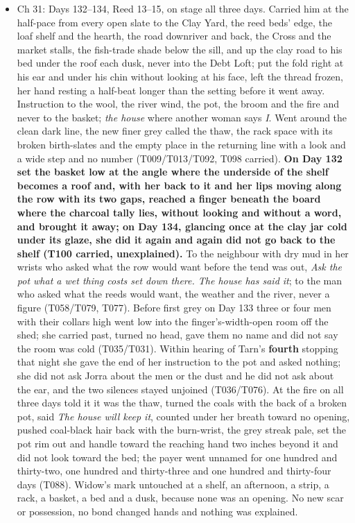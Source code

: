 \documentclass{design/chronicle}
\begin{document}
{\begin{itemize}[leftmargin=1.4em,itemsep=1pt,topsep=3pt,parsep=0pt]
\end{itemize}

\begin{itemize}[leftmargin=1.4em,itemsep=1pt,topsep=3pt,parsep=0pt]

\item Ch 31: Days 132–134, Reed 13–15, on stage all three days. Carried him at the half-pace from every open slate to the Clay Yard, the reed beds’ edge, the loaf shelf and the hearth, the road downriver and back, the Cross and the market stalls, the fish-trade shade below the sill, and up the clay road to his bed under the roof each dusk, never into the Debt Loft; put the fold right at his ear and under his chin without looking at his face, left the thread frozen, her hand resting a half-beat longer than the setting before it went away. Instruction to the wool, the river wind, the pot, the broom and the fire and never to the basket; \emph{the house} where another woman says \emph{I}. Went around the clean dark line, the new finer grey called the thaw, the rack space with its broken birth-slates and the empty place in the returning line with a look and a wide step and no number (T009/T013/T092, T098 carried). \textbf{On Day 132 set the basket low at the angle where the underside of the shelf becomes a roof and, with her back to it and her lips moving along the row with its two gaps, reached a finger beneath the board where the charcoal tally lies, without looking and without a word, and brought it away; on Day 134, glancing once at the clay jar cold under its glaze, she did it again and again did not go back to the shelf (T100 carried, unexplained).} To the neighbour with dry mud in her wrists who asked what the row would want before the tend was out, \emph{Ask the pot what a wet thing costs set down there. The house has said it}; to the man who asked what the reeds would want, the weather and the river, never a figure (T058/T079, T077). Before first grey on Day 133 three or four men with their collars high went low into the finger’s-width-open room off the shed; she carried past, turned no head, gave them no name and did not say the room was cold (T035/T031). Within hearing of Tarn’s \textbf{fourth} stopping that night she gave the end of her instruction to the pot and asked nothing; she did not ask Jorra about the men or the dust and he did not ask about the ear, and the two silences stayed unjoined (T036/T076). At the fire on all three days told it it was the thaw, turned the coals with the back of a broken pot, said \emph{The house will keep it}, counted under her breath toward no opening, pushed coal-black hair back with the burn-wrist, the grey streak pale, set the pot rim out and handle toward the reaching hand two inches beyond it and did not look toward the bed; the payer went unnamed for one hundred and thirty-two, one hundred and thirty-three and one hundred and thirty-four days (T088). Widow’s mark untouched at a shelf, an afternoon, a strip, a rack, a basket, a bed and a dusk, because none was an opening. No new scar or possession, no bond changed hands and nothing was explained.


\end{itemize}}
\end{document}
